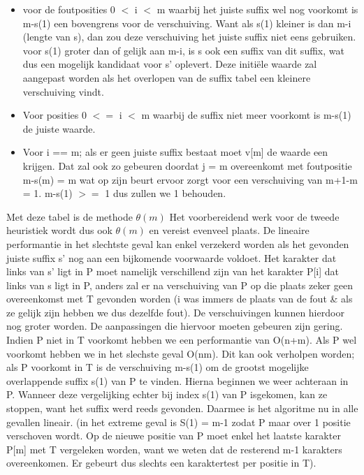\begin{itemize}
\item voor de foutposities 0 $<$ i $<$ m waarbij het juiste suffix wel nog voorkomt is m-s(1) een bovengrens voor de verschuiving. Want als s(1) kleiner is dan m-i (lengte van s), dan zou deze verschuiving het juiste suffix niet eens gebruiken. voor s(1) groter dan of gelijk aan m-i, is s ook een suffix van dit suffix, wat dus een mogelijk kandidaat voor s' oplevert. Deze initi\"ele waarde zal aangepast worden als het overlopen van de suffix tabel een kleinere verschuiving vindt.
\item Voor posities 0 $<=$ i $<$ m waarbij de suffix niet meer voorkomt is m-s(1) de juiste waarde. 
\item Voor i == m; als er geen juiste suffix bestaat moet v[m] de waarde een krijgen. Dat zal ook zo gebeuren doordat j = m overeenkomt met foutpositie m-s(m) = m wat op zijn beurt ervoor zorgt voor een verschuiving van m+1-m = 1. m-s(1) $>=$ 1 dus zullen we 1 behouden.
\end{itemize}
\npar
Met deze tabel is de methode $\theta(m)$ Het voorbereidend werk voor de tweede heuristiek wordt dus ook $\theta(m)$ en vereist evenveel plaats.
\npar
De lineaire performantie in het slechtste geval kan enkel verzekerd worden als het gevonden juiste suffix s' nog aan een bijkomende voorwaarde voldoet. Het karakter dat links van s' ligt in P moet namelijk verschillend zijn van het karakter P[i] dat links van s ligt in P, anders zal er na verschuiving van P op die plaats zeker geen overeenkomst met T gevonden worden (i was immers de plaats van de fout \& als ze gelijk zijn hebben we dus dezelfde fout). De verschuivingen kunnen hierdoor nog groter worden. De aanpassingen die hiervoor moeten gebeuren zijn gering.
\npar
Indien P niet in T voorkomt hebben we een performantie van O(n+m). Als P wel voorkomt hebben we in het slechste geval O(nm). Dit kan ook verholpen worden; als P voorkomt in T is de verschuiving m-s(1) om de grootst mogelijke overlappende suffix s(1) van P te vinden. Hierna beginnen we weer achteraan in P. Wanneer deze vergelijking echter bij index s(1) van P isgekomen, kan ze stoppen, want het suffix werd reeds gevonden. Daarmee is het algoritme nu in alle gevallen lineair. (in het extreme geval is S(1) = m-1 zodat P maar over 1 positie verschoven wordt. Op de nieuwe positie van P moet enkel het laatste karakter P[m] met T vergeleken worden, want we weten dat de resterend m-1 karakters overeenkomen. Er gebeurt dus slechts een karaktertest per positie in T).
